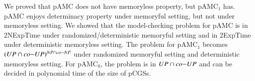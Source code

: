 \documentclass[letterpaper]{article}
\newcommand{\pamc}{{pAMC}\xspace}
\newcommand{\pamcs}{{pAMC$_0$}\xspace}
\newcommand{\pamcc}{{pAMC$_1$}\xspace}
\begin{document}
We proved that \pamc does not have memoryless property, but \pamcc has.
\pamc enjoys determinacy property under memoryful setting, but not under memoryless setting.
We showed that the model-checking  problem for \pamc is in {\sc 2NExpTime} under randomized/deterministic memoryful setting and in {\sc 2ExpTime} under deterministic memoryless setting.
The problem  for \pamcc becomes $({\sc UP\cap co{-}UP})^{{\sc NP\cap co{-}NP}}$ under randomized memoryful setting and
deterministic memoryless setting. For \pamcs, the problem is in ${\sc UP\cap co{-}UP}$ and can be decided in polynomial time
of the size of pCGSs.




\fontsize{9.5pt}{10.5pt}
\selectfont
\newpage



\newpage
\normalsize
\appendix

\end{document}
